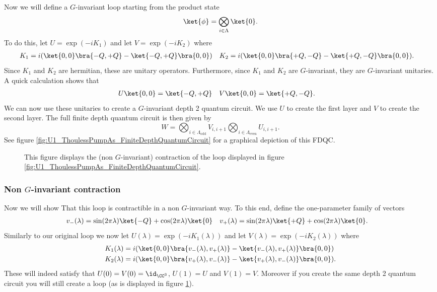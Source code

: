 Now we will define a $G$-invariant loop starting from the product state
\begin{equation}
\ket{\phi}=\bigotimes_{i\in\Lambda}\ket{0}.
\end{equation}
To do this, let $U=\exp(-iK_1)$ and let $V=\exp(-i K_2)$ where
\begin{align}
K_1&=i(\ket{0,0}\bra{-Q,+Q}-\ket{-Q,+Q}\bra{0,0})&K_2&=i(\ket{0,0}\bra{+Q,-Q}-\ket{+Q,-Q}\bra{0,0}).
\end{align}
Since $K_1$ and $K_2$ are hermitian, these are unitary operators. Furthermore, since $K_1$ and $K_2$ are $G$-invariant, they are $G$-invariant unitaries. A quick calculation shows that
\begin{align}
U\ket{0,0}&=\ket{-Q,+Q}&V \ket{0,0}&=\ket{+Q,-Q}.
\end{align}
We can now use these unitaries to create a $G$-invariant depth 2 quantum circuit. We use $U$ to create the first layer and $V$ to create the second layer. The full finite depth quantum circuit is then given by
\begin{equation}
W=\bigotimes_{i\in\Lambda_{\text{odd}}}V_{i,i+1}\bigotimes_{i\in\Lambda_{\text{even}}}U_{i,i+1}.
\end{equation}
See figure \ref{fig:U1_ThoulessPumpAs_FiniteDepthQuantumCircuit} for a graphical depiction of this FDQC.
\begin{figure}
	\centering
	\scalebox{0.78}{
		
	}
	\caption{This figure displays the (non $G$-invariant) contraction of the loop displayed in figure \ref{fig:U1_ThoulessPumpAs_FiniteDepthQuantumCircuit}.}
	\label{fig:U1_ThoulessPumpAs_FiniteDepthQuantumCircuit_Contraction}
\end{figure}
\subsubsection{Non $G$-invariant contraction}
Now we will show That this loop is contractible in a non $G$-invariant way. To this end, define the one-parameter family of vectors
\begin{align}
v_-(\lambda)&=\sin(2\pi\lambda)\ket{-Q}+\cos(2\pi\lambda)\ket{0}&v_+(\lambda)&=\sin(2\pi\lambda)\ket{+Q}+\cos(2\pi\lambda)\ket{0}.
\end{align}
Similarly to our original loop we now let $U(\lambda)=\exp(-iK_1(\lambda))$ and let $V(\lambda)=\exp(-i K_2(\lambda))$ where
\begin{align}
K_1(\lambda)&=i(\ket{0,0}\bra{v_-(\lambda),v_+(\lambda)}-\ket{v_-(\lambda),v_+(\lambda)}\bra{0,0})\\
K_2(\lambda)&=i(\ket{0,0}\bra{v_+(\lambda),v_-(\lambda)}-\ket{v_+(\lambda),v_-(\lambda)}\bra{0,0}).
\end{align}
These will indeed satisfy that $U(0)=V(0)=\id_{\CC^3}$, $U(1)=U$ and $V(1)=V$. Moreover if you create the same depth 2 quantum circuit you will still create a loop (as is displayed in figure \ref{fig:U1_ThoulessPumpAs_FiniteDepthQuantumCircuit_Contraction}).
